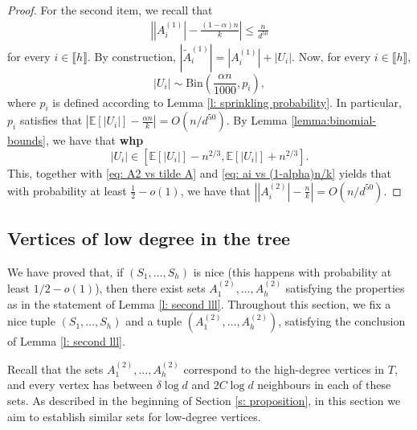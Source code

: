 \documentclass[notitlepage]{scrartcl}
\newcommand{\br}[1]{\llbracket{#1}\rrbracket}
\begin{document}
\begin{proof}
For the second item, we recall that 
\begin{align}
    \left||A_i^{(1)}|-\frac{(1-\alpha)n}{k}\right|\le \frac{n}{d^{50}} \label{eq: ai vs (1-alpha)n/k}    
\end{align}
for every $i\in \br{h}$. By construction, $|\tilde{A}_i^{(1)}|=|A_i^{(1)}|+|U_i|$. Now, for every $i\in \br{h}$, $$|U_i|\sim \text{Bin}\left(\frac{\alpha n}{1000},p_i\right),$$ where $p_i$ is defined according to Lemma \ref{l: sprinkling probability}. In particular, $p_i$ satisfies that $\left|\mathbb{E}[|U_i|]-\frac{\alpha n}{k}\right|=O(n/d^{50})$. By Lemma \ref{lemma:binomial-bounds}, we have that \textbf{whp} $$|U_i|\in \left[\mathbb{E}[|U_i|]-n^{2/3},\mathbb{E}[|U_i|]+n^{2/3}\right].$$ 
This, together with \eqref{eq: A2 vs tilde A} and \eqref{eq: ai vs (1-alpha)n/k} yields that with probability at least $\frac{1}{2}-o(1)$, we have that $\left||A_i^{(2)}| - \frac{n}{k}\right| = O\left(n/d^{50}\right)$. 
\end{proof}

\subsection{Vertices of low degree in the tree}\label{s: low degree}

We have proved that, if $(S_1,\ldots,S_h)$ is nice (this happens with probability at least $1/2-o(1)$), then there exist sets $A_1^{(2)},\ldots, A_h^{(2)}$ satisfying the properties as in the statement of Lemma \ref{l: second lll}.
Throughout this section, we fix a nice tuple $(S_1,\ldots,S_h)$ and a tuple $(A_1^{(2)},\ldots,A_h^{(2)})$, satisfying the conclusion of Lemma \ref{l: second lll}.



Recall that the sets $A_1^{(2)},\ldots, A_h^{(2)}$ correspond to the high-degree vertices in $T$, and every vertex has between $\delta\log d$ and $2C\log d$ neighbours in each of these sets. As described in the beginning of Section \ref{s: proposition}, in this section we aim to establish similar sets for low-degree vertices.
\end{document}
